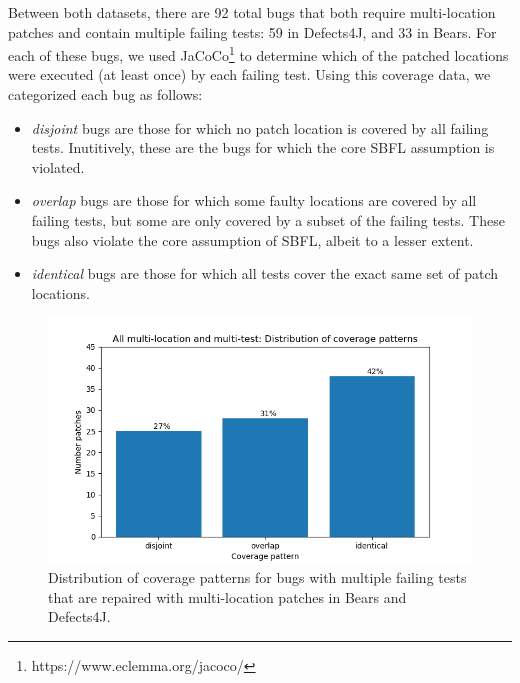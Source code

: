 Between both datasets, there are 92 total bugs that both require multi-location
patches and contain multiple failing tests: 59 in Defects4J, and 33 in
Bears. 
For each of these bugs, we used JaCoCo\footnote{https://www.eclemma.org/jacoco/}
to determine which of the patched locations were executed (at least once) by
each failing test. Using this coverage data, we categorized each bug as follows:
\begin{itemize}
\item \emph{disjoint} bugs are those for which no patch location is covered by all
failing tests.  Inutitively, these are the bugs for which the core SBFL
assumption is violated.
\item \emph{overlap} bugs are those for which some faulty locations are covered
by all failing tests, but some are only covered by a subset of the failing
tests. These bugs also violate the core assumption of SBFL, albeit to a lesser
extent.
\item \emph{identical} bugs are those for which all tests cover the exact same
  set of patch locations.
\end{itemize}


\begin{figure}
	\includegraphics[width=\linewidth]{img/coverage-all.png}
	\caption{Distribution of coverage patterns for bugs with multiple failing
      tests that are repaired with multi-location patches in Bears and Defects4J.}
	\label{fig:coverage-all}
\end{figure}


